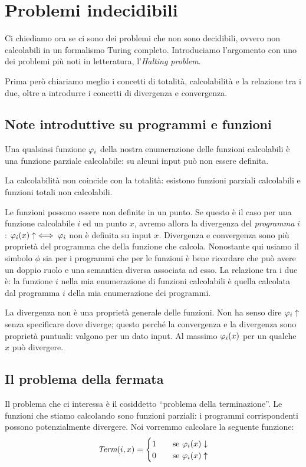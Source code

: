 \chapter{Problemi indecidibili}

Ci chiediamo ora se ci sono dei problemi che non sono decidibili, ovvero non calcolabili in un
formalismo Turing completo. Introduciamo l'argomento con uno dei problemi più noti in letteratura,
l'\textit{Halting problem}.

Prima però chiariamo meglio i concetti di totalità, calcolabilità e la relazione tra i due, oltre
a introdurre i concetti di divergenza e convergenza.

\section{Note introduttive su programmi e funzioni}

Una qualsiasi funzione $\varphi_{i}$ della nostra enumerazione delle funzioni calcolabili è una funzione
parziale calcolabile: su alcuni input può non essere definita. 

La calcolabilità non coincide con la totalità: esistono funzioni parziali calcolabili e funzioni
totali non calcolabili.

Le funzioni possono essere non definite in un punto. Se questo è il caso per una funzione
calcolabile $i$ ed un punto $x$, avremo allora la divergenza del \emph{programma} $i$: $\varphi_{i}(x)
\uparrow \iff \varphi_{i}$ non è definita su input $x$. Divergenza e convergenza sono più proprietà del
programma che della funzione che calcola. Nonostante qui usiamo il simbolo $\phi$ sia per i
programmi che per le funzioni è bene ricordare che può avere un doppio ruolo e una semantica
diversa associata ad esso. La relazione tra i due è: la funzione $i$ nella mia enumerazione di
funzioni calcolabili è quella calcolata dal programma $i$ della mia enumerazione dei programmi.

La divergenza non è una proprietà generale delle funzioni. Non ha senso dire $\varphi_{i} \uparrow$ senza
specificare dove diverge; questo perché la convergenza e la divergenza sono proprietà puntuali:
valgono per un dato input. Al massimo $\varphi_{i}(x)$ per un qualche $x$ può divergere.

\section{Il problema della fermata}

Il problema che ci interessa è il cosiddetto ``problema della terminazione''. Le funzioni che
stiamo calcolando sono funzioni parziali: i programmi corrispondenti possono potenzialmente
divergere. Noi vorremmo calcolare la seguente funzione:
\begin{equation*}
\textit{Term}(i,x) =
    \begin{cases}
        1 \quad & \text{se $\varphi_{i}(x) \downarrow$} \\
        0 \quad & \text{se $\varphi_{i}(x) \uparrow$} 
    \end{cases}
\end{equation*}

